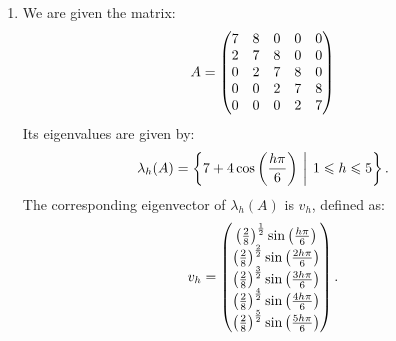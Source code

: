 \documentclass[10pt,twoside,openany]{memoir}
\begin{document}
\begin{enumerate}[label = (\alph*)]
        \item We are given the matrix:
            \begin{equation*}
            \begin{split}
                A = 
                \bmat 
                    7 & 8 & 0 & 0 & 0 \\
                    2 & 7 & 8 & 0 & 0 \\
                    0 & 2 & 7 & 8 & 0 \\
                    0 & 0 & 2 & 7 & 8 \\
                    0 & 0 & 0 & 2 & 7 
                \emat
            \end{split}
            \end{equation*}
        Its eigenvalues are given by:
            \begin{equation*}
            \begin{split}
                \lambda_h(A) = \left\{7 + 4\cos \left( \frac{h \pi}{6}\right) \h2\bigg|\h4 1 \leq h \leq 5\right\}.
            \end{split}
            \end{equation*}
        The corresponding eigenvector of $\lambda_h(A)$ is $v_h$, defined as:
            \begin{equation*}
            \begin{split}
                v_h = 
                \bmat
                    \left( \frac{2}{8}\right)^\frac{1}{2}\sin \left( \frac{h \pi}{6} \right) \\
                    \left( \frac{2}{8}\right)^\frac{2}{2}\sin \left( \frac{2h \pi}{6} \right) \\
                    \left( \frac{2}{8}\right)^\frac{3}{2}\sin \left( \frac{3h \pi}{6} \right) \\
                    \left( \frac{2}{8}\right)^\frac{4}{2}\sin \left( \frac{4h \pi}{6} \right) \\
                    \left( \frac{2}{8}\right)^\frac{5}{2}\sin \left( \frac{5h \pi}{6} \right) \\
                \emat.
            \end{split}
            \end{equation*}
\end{enumerate}
\end{document}
